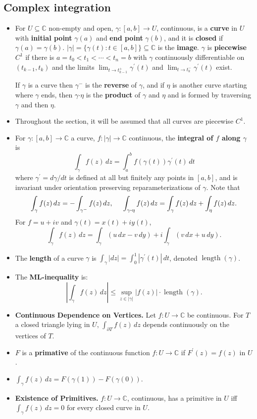 \documentclass{article}
\DeclareMathOperator{\len}{length}
\newenvironment{topic}[1]{%
{\subsection{#1}}%
\begin{itemize}%
}{%
\end{itemize}%
}
\newcommand{\theorem}[1]{\item {\bf #1.}}
\newcommand{\term}[1]{{\bf #1}}
\newcommand{\remark}{\item}
\newcommand{\curveproduct}{\boldsymbol{\cdot}}
\begin{document}
\begin{topic}{Complex integration}

\remark For $U \subseteq \mathbb{C}$ non-empty and open, $\gamma : [a, b] \to U$, continuous, is a \term{curve} in $U$ with \term{initial point} $\gamma(a)$ and \term{end point} $\gamma(b)$, and it is \term{closed} if $\gamma(a) = \gamma(b)$. $|\gamma| = \{ \gamma(t) : t \in [a, b] \} \subseteq \mathbb{C}$ is the \term{image}. $\gamma$ is \term{piecewise $C^1$} if there is $a = t_0 < t_1 < \cdots < t_n = b$ with $\gamma$ continuously differentiable on $(t_{k-1}, t_k)$ and the limits $\lim_{t \to t_{k-1}^+} \gamma^\prime(t)$ and $\lim_{t \to t_k^-} \gamma^\prime(t)$ exist.

If $\gamma$ is a curve then $\gamma^-$ is the \term{reverse} of $\gamma$, and if $\eta$ is another curve starting where $\gamma$ ends, then $\gamma \curveproduct \eta$ is the \term{product} of $\gamma$ and $\eta$ and is formed by traversing $\gamma$ and then $\eta$.

\remark Throughout the section, it will be assumed that all curves are piecewise $C^1$.

\remark For $\gamma : [a, b] \to \mathbb{C}$ a curve, $f : |\gamma| \to \mathbb{C}$ continuous, the \term{integral of $f$ along $\gamma$} is $$\int_\gamma f(z)\,dz = \int_a^b f(\gamma(t)) \gamma^\prime(t)\,dt$$ where $\gamma^\prime = d\gamma/dt$ is defined at all but finitely any points in $[a, b]$, and is invariant under orientation preserving reparameterizations of $\gamma$. Note that $$\int_\gamma f(z)\,dz = - \int_{\gamma^-} f(z)\,dz, \hskip 0.5cm \int_{\gamma \curveproduct \eta} f(z)\,dz = \int_\gamma f(z)\,dz + \int_\eta f(z)\,dz.$$ For $f = u + iv$ and $\gamma(t) = x(t) + iy(t)$, $$\int_\gamma f(z)\,dz = \int_\gamma (u\,dx - v\,dy) + i \int_\gamma (v\,dx + u\,dy).$$

\remark The \term{length} of a curve $\gamma$ is $\int_\gamma |dz| = \int_0^1 |\gamma^\prime(t)|\,dt$, denoted $\len(\gamma)$.

\remark The \term{ML-inequality} is: $$\left|\int_\gamma f(z)\,dz\right| \leq \sup_{z \in |\gamma|} |f(z)| \cdot \len(\gamma).$$

\theorem{Continuous Dependence on Vertices} Let $f : U \to \mathbb{C}$ be continuous. For $T$ a closed triangle lying in $U$, $\int_{\partial T} f(z)\,dz$ depends continuously on the vertices of $T$.

\remark $F$ is a \term{primative} of the continuous function $f : U \to \mathbb{C}$ if $F^\prime(z) = f(z)$ in $U$.

\remark $\int_{\gamma} f(z)\,dz = F(\gamma(1)) - F(\gamma(0))$.

\theorem{Existence of Primitives} $f : U \to \mathbb{C}$, continuous, has a primitive in $U$ iff $\int_\gamma f(z)\, dz = 0$ for every closed curve in $U$.

\end{topic}
\end{document}
